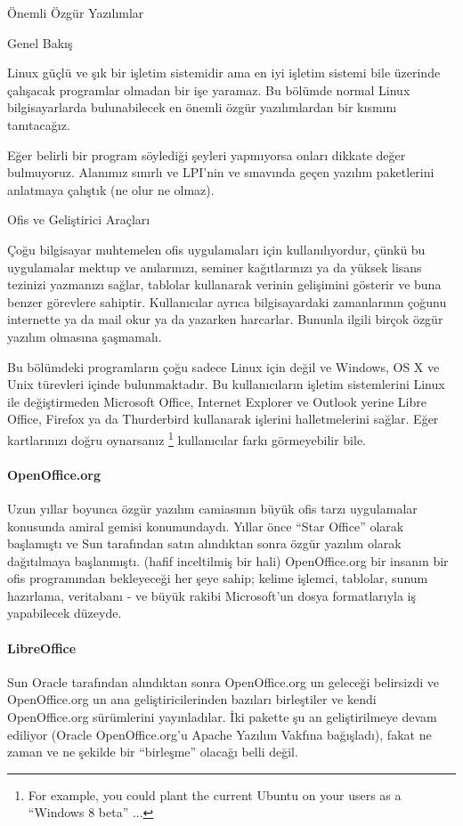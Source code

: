 \begin{section}{Önemli Özgür Yazılımlar}
\begin{subsection}{Genel Bakış}

Linux güçlü ve şık bir işletim sistemidir ama en iyi işletim sistemi bile üzerinde çalışacak programlar olmadan bir işe yaramaz. Bu bölümde normal Linux bilgisayarlarda bulunabilecek en önemli özgür yazılımlardan bir kısmını tanıtacağız.

Eğer belirli bir program söylediği şeyleri yapmıyorsa onları dikkate değer bulmuyoruz. Alanımız sınırlı ve LPI'nin ve sınavında geçen yazılım paketlerini anlatmaya çalıştık (ne olur ne olmaz).
\end{subsection}
\begin{subsection}{Ofis ve Geliştirici Araçları}

Çoğu bilgisayar muhtemelen ofis uygulamaları için kullanılıyordur, çünkü bu uygulamalar mektup ve anılarınızı, seminer kağıtlarınızı ya da yüksek lisans tezinizi yazmanızı sağlar, tablolar kullanarak verinin gelişimini gösterir ve buna benzer görevlere sahiptir. Kullanıcılar ayrıca bilgisayardaki zamanlarının çoğunu internette ya da mail okur ya da yazarken harcarlar. Bununla ilgili birçok özgür yazılım olmasına şaşmamalı.

Bu bölümdeki programların çoğu sadece Linux için değil ve Windows, OS X ve Unix türevleri içinde bulunmaktadır. Bu kullanıcıların işletim sistemlerini Linux ile değiştirmeden Microsoft Office, Internet Explorer ve Outlook yerine Libre Office, Firefox ya da Thurderbird kullanarak işlerini halletmelerini sağlar. Eğer kartlarınızı doğru oynarsanız
\footnote{For example, you could plant the current Ubuntu on your users as a “Windows 8 beta” ...} kullanıcılar farkı görmeyebilir bile.

\paragraph{OpenOffice.org}{Uzun yıllar boyunca özgür yazılım camiasının büyük ofis tarzı uygulamalar konusunda amiral gemisi konumundaydı. Yıllar önce “Star Office” olarak başlamıştı ve Sun tarafından satın alındıktan sonra özgür yazılım olarak dağıtılmaya başlanmıştı. (hafif inceltilmiş bir hali) OpenOffice.org bir insanın bir ofis programından bekleyeceği her şeye sahip; kelime işlemci, tablolar, sunum hazırlama, veritabanı - ve büyük rakibi Microsoft'un dosya formatlarıyla iş yapabilecek düzeyde.}
\paragraph{LibreOffice}{Sun Oracle tarafından alındıktan sonra OpenOffice.org un geleceği belirsizdi ve OpenOffice.org un ana geliştiricilerinden bazıları birleştiler ve kendi OpenOffice.org sürümlerini yayınladılar. İki pakette şu an geliştirilmeye devam ediliyor (Oracle OpenOffice.org'u Apache Yazılım Vakfına bağışladı), fakat ne zaman ve ne şekilde bir “birleşme” olacağı belli değil.}


\end{subsection}
\end{section}
